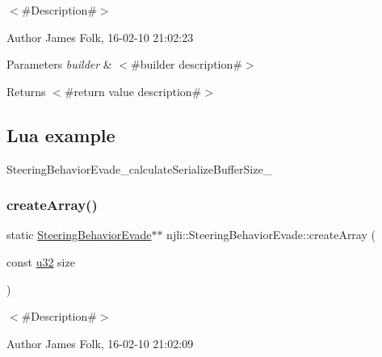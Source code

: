 $<$\#\+Description\#$>$ 

\begin{DoxyAuthor}{Author}
James Folk, 16-\/02-\/10 21\+:02\+:23
\end{DoxyAuthor}

\begin{DoxyParams}{Parameters}
{\em builder} & $<$\#builder description\#$>$\\
\hline
\end{DoxyParams}
\begin{DoxyReturn}{Returns}
$<$\#return value description\#$>$
\end{DoxyReturn}
\hypertarget{classnjli_1_1_steering_behavior_wander_ex1}{}\subsection{Lua example}\label{classnjli_1_1_steering_behavior_wander_ex1}

\begin{DoxyCodeInclude}
\end{DoxyCodeInclude}
Steering\+Behavior\+Evade\+\_\+calculate\+Serialize\+Buffer\+Size\+\_\+ \mbox{\label{classnjli_1_1_steering_behavior_evade_a522887462e45b7e35476b2974a2c8373}} 
\subsubsection{\texorpdfstring{create\+Array()}{createArray()}}
{\footnotesize\ttfamily static \mbox{\hyperlink{classnjli_1_1_steering_behavior_evade}{Steering\+Behavior\+Evade}}$\ast$$\ast$ njli\+::\+Steering\+Behavior\+Evade\+::create\+Array (\begin{DoxyParamCaption}\item[{const \mbox{\hyperlink{_util_8h_a10e94b422ef0c20dcdec20d31a1f5049}{u32}}}]{size }\end{DoxyParamCaption})\hspace{0.3cm}{\ttfamily [static]}}



$<$\#\+Description\#$>$ 

\begin{DoxyAuthor}{Author}
James Folk, 16-\/02-\/10 21\+:02\+:09
\end{DoxyAuthor}

